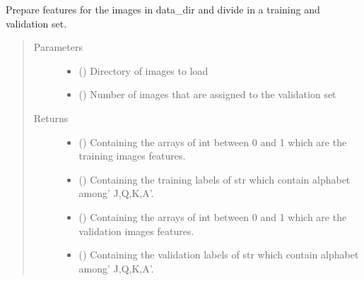 \documentclass[letterpaper,10pt,english]{sphinxmanual}
\begin{document}

\begin{fulllineitems}
\label{\detokenize{data_sets:data_sets.load_data_set}}
\pysigstartsignatures
{}
\pysigstopsignatures
\sphinxAtStartPar
Prepare features for the images in data\_dir and divide in a training and validation set.
\begin{quote}\begin{description}
\item[{Parameters}] \leavevmode\begin{itemize}
\item {} 
\sphinxAtStartPar
{} () \textendash{} Directory of images to load

\item {} 
\sphinxAtStartPar
{} () \textendash{} Number of images that are assigned to the validation set

\end{itemize}

\item[{Returns}] \leavevmode
\sphinxAtStartPar
\begin{itemize}
\item {} 
\sphinxAtStartPar
{} () \textendash{} Containing the arrays of int between 0 and 1 which are the training images features.

\item {} 
\sphinxAtStartPar
{} () \textendash{} Containing the training labels of str which contain alphabet among’ J,Q,K,A’.

\item {} 
\sphinxAtStartPar
{} () \textendash{} Containing the arrays of int between 0 and 1 which are the validation images features.

\item {} 
\sphinxAtStartPar
{} () \textendash{} Containing the validation labels of str which contain alphabet among’ J,Q,K,A’.

\end{itemize}


\end{description}\end{quote}

\end{fulllineitems}
\end{document}
